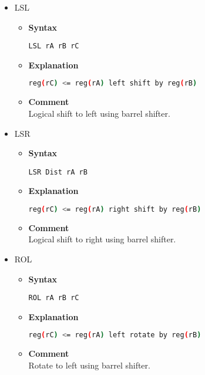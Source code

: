 \begin{itemize}
    \item LSL
    \begin{itemize}
        \item \textbf{Syntax}
        \begin{lstlisting}[language={[markII]Assembler}, frame=single]
    LSL rA rB rC
        \end{lstlisting}
        \item \textbf{Explanation}
        \begin{lstlisting}[language=bash, frame=single]
    reg(rC) <= reg(rA) left shift by reg(rB)
        \end{lstlisting}
        \item \textbf{Comment} \\
    Logical shift to left using barrel shifter.
    \end{itemize}

    \item LSR
    \begin{itemize}
        \item \textbf{Syntax}
        \begin{lstlisting}[language={[markII]Assembler}, frame=single]
    LSR Dist rA rB
        \end{lstlisting}
        \item \textbf{Explanation}
        \begin{lstlisting}[language=bash, frame=single]
    reg(rC) <= reg(rA) right shift by reg(rB)
        \end{lstlisting}
        \item \textbf{Comment} \\
    Logical shift to right using barrel shifter.
    \end{itemize}

    \item ROL
    \begin{itemize}
        \item \textbf{Syntax}
        \begin{lstlisting}[language={[markII]Assembler}, frame=single]
    ROL rA rB rC
        \end{lstlisting}
        \item \textbf{Explanation}
        \begin{lstlisting}[language=bash, frame=single]
    reg(rC) <= reg(rA) left rotate by reg(rB)
        \end{lstlisting}
        \item \textbf{Comment} \\
    Rotate to left using barrel shifter.
    \end{itemize}


\end{itemize}
